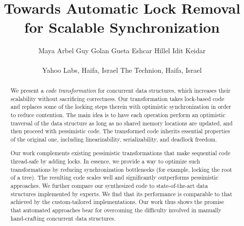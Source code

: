 \documentclass[11pt]{article}
\begin{document}
\title{Towards Automatic Lock Removal\\ for Scalable Synchronization}
\author{
Maya Arbel\footnotemark[1] \footnotemark[2] \hspace{0.3in} 
Guy Golan Gueta\footnotemark[1]  \hspace{0.3in}
Eshcar Hillel\footnotemark[1]  \hspace{0.3in}
Idit Keidar\footnotemark[1] \footnotemark[2]\\
\\
\large{
\footnotemark[1]Yahoo Labs, Haifa, Israel \hspace{0.3in} 
\footnotemark[2]The Technion, Haifa, Israel
}
}
\date{}

\maketitle

\begin{abstract}
We present a \emph{code transformation} for concurrent data structures,
which increases their scalability without sacrificing correctness.
Our transformation takes lock-based code and replaces some of the
locking steps therein with optimistic synchronization in order to reduce contention. The main idea is to
have each operation perform an optimistic traversal of the data structure
as long as no shared memory locations are updated, and then proceed with
pessimistic code. The transformed code inherits essential
properties of the original one, including linearizability, serializability,
and deadlock freedom.

Our work complements existing pessimistic transformations that make
sequential code thread-safe by adding locks.
In essence, we provide a way to optimize such transformations by reducing
synchronization bottlenecks (for example, locking the root of a tree).
The resulting code scales well and significantly outperforms
pessimistic approaches. We further compare our synthesized code to state-of-the-art
data structures implemented by experts.
We find that its performance is comparable %
to that achieved by the custom-tailored implementations.
Our work thus shows the promise that automated approaches
bear for overcoming the difficulty involved in manually
hand-crafting concurrent data structures.

\end{abstract}
\end{document}
